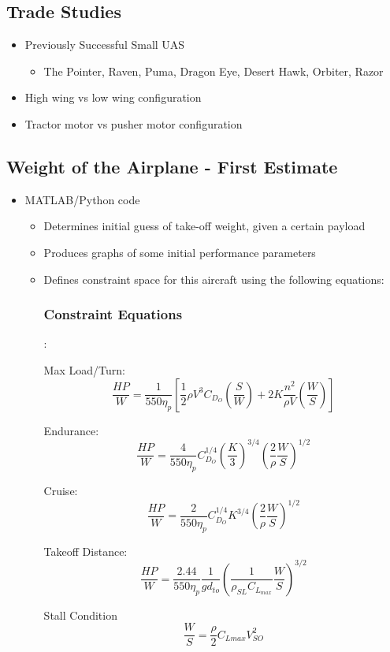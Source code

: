 \documentclass[]{article}
\begin{document}
\subsection{Trade Studies}
\begin{itemize}
\item Previously Successful Small UAS
	\begin{itemize}
	\item The Pointer, Raven, Puma, Dragon Eye, Desert Hawk, Orbiter, Razor
	\end{itemize}
\item High wing vs low wing configuration
\item Tractor motor vs pusher motor configuration
\end{itemize} 

\subsection{Weight of the Airplane - First Estimate}
\begin{itemize}
\item MATLAB/Python code
	\begin{itemize}
	\item Determines initial guess of take-off weight, given a certain payload	
	\item Produces graphs of some initial performance parameters
	\item Defines constraint space for this aircraft using the following equations:
	\subsubsection{Constraint Equations}:
	
	Max Load/Turn:
	\begin{equation}
	\frac{HP}{W}= \frac{1}{550\eta_{p}}[\frac{1}{2}\rho V^{3} C_{D_{O}} (\frac{S}{W}) + 2K \frac{n^2}{\rho V} (\frac{W}{S})]
	\end{equation}
	
	Endurance:
	\begin{equation}
	\frac{HP}{W}=\frac{4}{550\eta_{p}} C_{D_{O}}^{1/4} (\frac{K}{3})^{3/4} (\frac{2}{\rho} \frac{W}{S})^{1/2}
	\end{equation}
	
	Cruise:
	\begin{equation}
	\frac{HP}{W}=\frac{2}{550\eta_{p}} C_{D_{O}}^{1/4} K^{3/4} (\frac{2}{\rho} \frac{W}{S})^{1/2}
	\end{equation}
	
	Takeoff Distance:
	\begin{equation}
	\frac{HP}{W}=\frac{2.44}{550\eta_{p}} \frac{1}{gd_{to}}(\frac{1}{\rho_{SL} C_{L_{max}}} \frac{W}{S})^{3/2}
	\end{equation}
	
	Stall Condition
	\begin{equation}
	\frac{W}{S}= \frac{\rho}{2} C_{L{max}} V_{SO}^2
	\end{equation}
	
	
	\end{itemize}	
\end{itemize}
\end{document}
